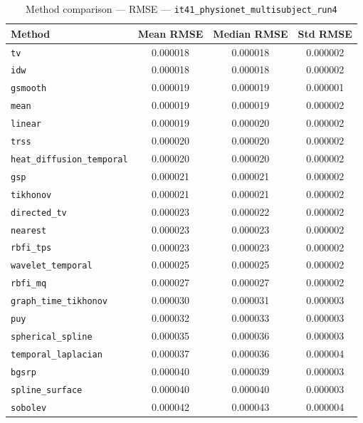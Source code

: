\begin{table}[ht]
\centering
\caption{Method comparison — RMSE — \texttt{it41_physionet_multisubject_run4}}
\label{tab:rmse_it41_physionet_multisubject_run4}
\begin{tabular}{lccc}
\hline
Method & Mean RMSE & Median RMSE & Std RMSE \\
\hline
\texttt{tv} & 0.000018 & 0.000018 & 0.000002 \\
\texttt{idw} & 0.000018 & 0.000018 & 0.000002 \\
\texttt{gsmooth} & 0.000019 & 0.000019 & 0.000001 \\
\texttt{mean} & 0.000019 & 0.000019 & 0.000002 \\
\texttt{linear} & 0.000019 & 0.000020 & 0.000002 \\
\texttt{trss} & 0.000020 & 0.000020 & 0.000002 \\
\texttt{heat_diffusion_temporal} & 0.000020 & 0.000020 & 0.000002 \\
\texttt{gsp} & 0.000021 & 0.000021 & 0.000002 \\
\texttt{tikhonov} & 0.000021 & 0.000021 & 0.000002 \\
\texttt{directed_tv} & 0.000023 & 0.000022 & 0.000002 \\
\texttt{nearest} & 0.000023 & 0.000023 & 0.000002 \\
\texttt{rbfi_tps} & 0.000023 & 0.000023 & 0.000002 \\
\texttt{wavelet_temporal} & 0.000025 & 0.000025 & 0.000002 \\
\texttt{rbfi_mq} & 0.000027 & 0.000027 & 0.000002 \\
\texttt{graph_time_tikhonov} & 0.000030 & 0.000031 & 0.000003 \\
\texttt{puy} & 0.000032 & 0.000033 & 0.000003 \\
\texttt{spherical_spline} & 0.000035 & 0.000036 & 0.000003 \\
\texttt{temporal_laplacian} & 0.000037 & 0.000036 & 0.000004 \\
\texttt{bgsrp} & 0.000040 & 0.000039 & 0.000003 \\
\texttt{spline_surface} & 0.000040 & 0.000040 & 0.000003 \\
\texttt{sobolev} & 0.000042 & 0.000043 & 0.000004 \\
\hline
\end{tabular}
\end{table}
